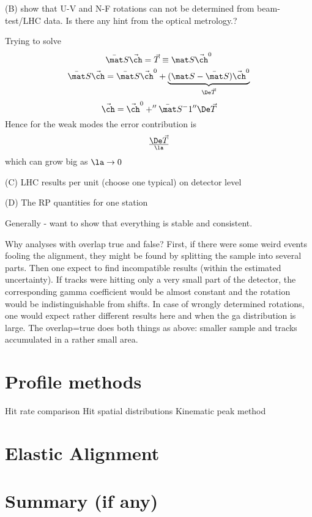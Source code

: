 
(B) show that U-V and N-F rotations can not be determined from beam-test/LHC data. Is there any hint from the optical metrology.?

Trying to solve
$$\bar \mat S \vec\ch = \vec T \equiv \mat S \vec\ch^0 $$
$$\bar \mat S \vec\ch = \bar\mat S \vec\ch^0 + \underbrace{(\mat S - \bar\mat S) \vec\ch^0}_{\De\vec T}$$
$$\vec\ch = \vec\ch^0 + ''\bar\mat S^-1 '' \De \vec T$$
Hence for the weak modes the error contribution is
$$\De\vec T\over\la$$
which can grow big as $\la\to 0$



(C)  LHC results per unit (choose one typical) on detector level


(D) The RP quantities for one station


Generally - want to show that everything is stable and consistent.

Why analyses with overlap true and false?
\> First, if there were some weird events fooling the alignment, they might be found by splitting the sample into several parts. Then one expect to find incompatible results (within the estimated uncertainty).
\> If tracks were hitting only a very small part of the detector, the corresponding gamma coefficient would be almost constant and the rotation would be indistinguishable from shifts. In case of wrongly determined rotations, one would expect rather different results here and when the ga distribution is large.
\> The overlap=true does both things as above: smaller sample and tracks accumulated in a rather small area.

\section{Profile methods}

\> Hit rate comparison
\> Hit spatial distributions
\> Kinematic peak method

\section{Elastic Alignment}

\section{Summary (if any)}
